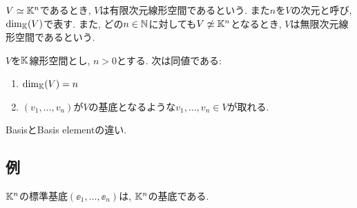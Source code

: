 \begin{definition}
  $V\simeq \mathbb{K}^n$であるとき,
  $V$は有限次元線形空間であるという.
  また$n$を$V$の次元と呼び,
  $\dim_{\mathbb{K}}(V)$で表す.
  また, どの$n\in\mathbb{N}$に対しても$V\not\simeq \mathbb{K}^n$となるとき,
  $V$は無限次元線形空間であるという.
\end{definition}
\begin{lemma}
  $V$を$\mathbb{K}$線形空間とし, $n>0$とする.
  次は同値である:
  \begin{enumerate}
  \item $\dim_{\mathbb{K}}(V)=n$
  \item $(v_1,\ldots,v_n)$が$V$の基底となるような$v_1,\ldots,v_n\in V$が取れる.
  \end{enumerate}
\end{lemma}

\begin{remark}
BasisとBasis elementの違い.
\end{remark}

\subsection{例}
\begin{example}
  $\mathbb{K}^n$の標準基底$(\ee_1,\ldots,\ee_n)$は,
  $\mathbb{K}^n$の基底である.
\end{example}

